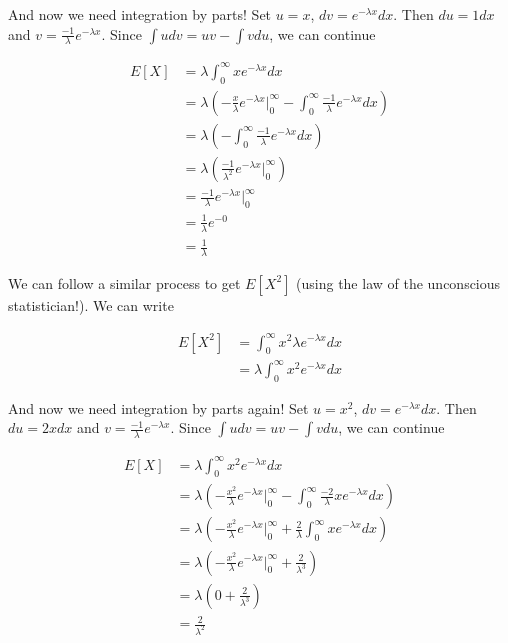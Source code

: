 \documentclass[
  letterpaper,
  DIV=11,
  numbers=noendperiod]{scrreprt}
\begin{document}
And now we need integration by parts! Set \(u = x\),
\(dv = e^{-\lambda x} dx\). Then \(du = 1dx\) and
\(v = \frac{-1}{\lambda} e^{-\lambda x}\). Since
\(\int u dv = uv - \int vdu\), we can continue

\begin{align*}    
E[X] & = \lambda \int_0^\infty x e^{-\lambda x} dx \\    
& = \lambda \left( -\frac{x}{\lambda} e^{-\lambda x} \bigg|_0^\infty  - \int_0^\infty \frac{-1}{\lambda} e^{-\lambda x} dx \right) \\    
& = \lambda \left( - \int_0^\infty \frac{-1}{\lambda} e^{-\lambda x} dx \right) \\    
& = \lambda \left( \frac{-1}{\lambda^2} e^{-\lambda x}  \bigg|_0^\infty \right) \\    
& = \frac{-1}{\lambda} e^{-\lambda x}  \bigg|_0^\infty \\    
& = \frac{1}{\lambda} e^{-0} \\    
& = \frac{1}{\lambda}
\end{align*}

We can follow a similar process to get \(E[X^2]\) (using the law of the
unconscious statistician!). We can write

\begin{align*}
    E[X^2] & = \int_0^\infty x^2 \lambda e^{-\lambda x} dx \\
    & = \lambda \int_0^\infty x^2 e^{-\lambda x} dx 
\end{align*}

And now we need integration by parts again! Set \(u = x^2\),
\(dv = e^{-\lambda x} dx\). Then \(du = 2xdx\) and
\(v = \frac{-1}{\lambda} e^{-\lambda x}\). Since
\(\int u dv = uv - \int vdu\), we can continue

\begin{align*}
    E[X] & = \lambda \int_0^\infty x^2 e^{-\lambda x} dx \\
    & = \lambda \left( -\frac{x^2}{\lambda} e^{-\lambda x} \bigg|_0^\infty  - \int_0^\infty \frac{-2}{\lambda} xe^{-\lambda x} dx \right) \\
    & = \lambda \left( -\frac{x^2}{\lambda} e^{-\lambda x} \bigg|_0^\infty  + \frac{2}{\lambda} \int_0^\infty  xe^{-\lambda x} dx \right) \\
    & = \lambda \left( -\frac{x^2}{\lambda} e^{-\lambda x} \bigg|_0^\infty  + \frac{2}{\lambda^3} \right)\\
    & = \lambda \left( 0  + \frac{2}{\lambda^3} \right) \\
    & = \frac{2}{\lambda^2}
\end{align*}
\end{document}
